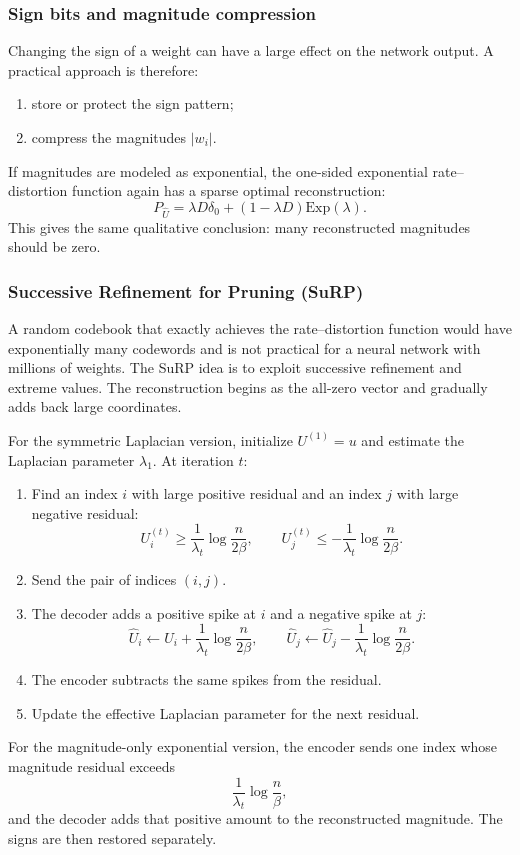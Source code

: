 \subsubsection*{Sign bits and magnitude compression}

Changing the sign of a weight can have a large effect on the network output.
A practical approach is therefore:
\begin{enumerate}[leftmargin=2em]
    \item store or protect the sign pattern;
    \item compress the magnitudes $|w_i|$.
\end{enumerate}
If magnitudes are modeled as exponential, the one-sided exponential rate--distortion function again has a sparse optimal reconstruction:
\[
    P_{\widehat U}=\lambda D\delta_0+(1-\lambda D)\mathrm{Exp}(\lambda).
\]
This gives the same qualitative conclusion: many reconstructed magnitudes should be zero.

\subsubsection*{Successive Refinement for Pruning (SuRP)}

A random codebook that exactly achieves the rate--distortion function would have exponentially many codewords and is not practical for a neural network with millions of weights.
The SuRP idea is to exploit successive refinement and extreme values.
The reconstruction begins as the all-zero vector and gradually adds back large coordinates.

For the symmetric Laplacian version, initialize $U^{(1)}=u$ and estimate the Laplacian parameter $\lambda_1$.
At iteration $t$:
\begin{enumerate}[leftmargin=2em]
    \item Find an index $i$ with large positive residual and an index $j$ with large negative residual:
    \[
        U_i^{(t)}\ge \frac1{\lambda_t}\log\frac{n}{2\beta},
        \qquad
        U_j^{(t)}\le -\frac1{\lambda_t}\log\frac{n}{2\beta}.
    \]
    \item Send the pair of indices $(i,j)$.
    \item The decoder adds a positive spike at $i$ and a negative spike at $j$:
    \[
        \widehat U_i \leftarrow \widehat U_i+\frac1{\lambda_t}\log\frac{n}{2\beta},
        \qquad
        \widehat U_j \leftarrow \widehat U_j-\frac1{\lambda_t}\log\frac{n}{2\beta}.
    \]
    \item The encoder subtracts the same spikes from the residual.
    \item Update the effective Laplacian parameter for the next residual.
\end{enumerate}
For the magnitude-only exponential version, the encoder sends one index whose magnitude residual exceeds
\[
    \frac1{\lambda_t}\log\frac{n}{\beta},
\]
and the decoder adds that positive amount to the reconstructed magnitude.
The signs are then restored separately.

